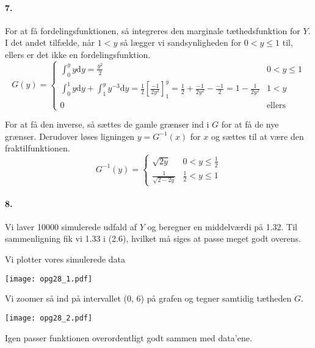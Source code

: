 \documentclass[12pt]{article}
\begin{document}
\paragraph{7.}
For at få fordelingsfunktionen, så integreres den marginale tæthedsfunktion for $Y$. I det andet tilfælde, når $1 < y$ så lægger vi sandsynligheden for $0 < y \leq 1$ til, ellers er det ikke en fordelingsfunktion.
\[
    G(y) =
    \begin{cases}
        \int_0^y y \mathrm{d}y = \frac{y^2}{2} & 0<y\leq 1\\
        \int_0^1 y \mathrm{d}y + \int_1^y y^{-3} \mathrm{d}y = \frac{1}{2}\left[ \frac{-1}{2y^2} \right]_1^y = \frac{1}{2} + \frac{-1}{2y^2} - \frac{-1}{2} = 1-\frac{1}{2y^2} & 1 < y \\
        0 &\text{ellers}
    \end{cases}
\]

For at få den inverse, så sættes de gamle grænser ind i $G$ for at få de nye grænser. Derudover løses ligningen $y = G^{-1}(x)$ for $x$ og sættes til at være den fraktilfunktionen.
\[
    G^{-1}(y) =
    \begin{cases}
        \sqrt{2y} & 0 < y \leq \frac{1}{2} \\
        \frac{1}{\sqrt{2-2y}} & \frac{1}{2} < y \leq 1
    \end{cases}
\]

\paragraph{8.}
Vi laver 10000 simulerede udfald af $Y$ og beregner en middelværdi på 1.32. Til sammenligning fik vi 1.33 i (2.6), hvilket må siges at passe meget godt overens.

Vi plotter vores simulerede data
\begin{center}
  \texttt{[image: opg28\_1.pdf]}
\end{center}

Vi zoomer så ind på intervallet (0, 6) på grafen og tegner samtidig tætheden $G$.
\begin{center}
  \texttt{[image: opg28\_2.pdf]}
\end{center}

Igen passer funktionen overordentligt godt sammen med data'ene.
\end{document}

